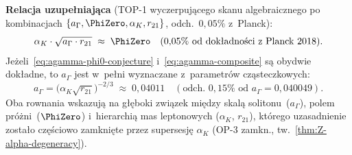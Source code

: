 \begin{hypothesis}[Hipoteza maksymalna: $a_\Gamma = 1/\PhiZero$]
\medskip\noindent
\textbf{Relacja uzupe\l{}niaj\k{a}ca} (TOP-1 wyczerpuj\k{a}cego skanu algebraicznego
po kombinacjach $\{a_\Gamma, \PhiZero, \alpha_K, r_{21}\}$, odch.\ $0{,}05\%$
z~Planck):
\begin{equation}\label{eq:agamma-composite}
  \alpha_K \cdot \sqrt{a_\Gamma \cdot r_{21}} \;\approx\; \PhiZero
  \quad (0{,}05\%\text{ od dok\l{}adno\'sci z~Planck~2018}).
\end{equation}
Je\.zeli~\eqref{eq:agamma-phi0-conjecture} i~\eqref{eq:agamma-composite}
s\k{a} obydwie dok\l{}adne, to $a_\Gamma$ jest w~pe\l{}ni wyznaczane
z~parametr\'ow cz\k{a}steczkowych:
\[
  a_\Gamma = \bigl(\alpha_K \sqrt{r_{21}}\bigr)^{-2/3}
  \;\approx\; 0{,}04011
  \quad (\text{odch.\ }0{,}15\%\text{ od }a_\Gamma=0{,}040049).
\]
Oba rownania wskazuj\k{a} na g\l{}\k{e}boki zwi\k{a}zek mi\k{e}dzy
skal\k{a} solitonu~($a_\Gamma$), polem pr\'o\.zni~($\PhiZero$)
i~hierarchi\k{a} mas leptonowych ($\alpha_K$, $r_{21}$),
kt\'orego uzasadnienie zosta\l{}o cz\k{e}\'sciowo zamkni\k{e}te
przez supersesj\k{e} $\alpha_K$ (OP-3 zamkn.,
tw.~\ref{thm:Z-alpha-degeneracy}).
\end{hypothesis}

